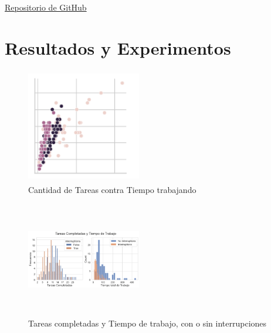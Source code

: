 \documentclass[10pt,a4paper,twocolumn]{article}
\begin{document}
\href{https://github.com/roo1202/Discrete-Event-Simulation-person-working}{Repositorio de GitHub}

\section{Resultados y Experimentos} 

\begin{figure}[H] %
    \centering %
    \includegraphics[width=5cm, height=5cm]{Tareas_tiempotareas.png} %
    \caption{Cantidad de Tareas contra Tiempo trabajando } %
    \label{fig:mi_imagen4} %
\end{figure}

\begin{figure}[H] %
    \centering %
    \includegraphics[width=5cm, height=5cm]{tareas_interrupciones.png} %
    \caption{Tareas completadas y Tiempo de trabajo, con o sin interrupciones} %
    \label{fig:mi_imagen5} %
\end{figure}
\end{document}
